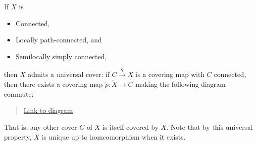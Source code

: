 \begin{proposition}

If \(X\) is

\begin{itemize}
\tightlist
\item
  Connected,
\item
  Locally path-connected, and
\item
  Semilocally simply connected,
\end{itemize}

then \(X\) admits a universal cover: if \(C \xrightarrow{q} X\) is a
covering map with \(C\) connected, then there exists a covering map
\(\tilde p: \tilde X \to C\) making the following diagram commute:

\begin{center}
\end{center}

\begin{quote}
\href{https://q.uiver.app/?q=WzAsMyxbMCwyLCJYIl0sWzAsMCwiQyJdLFsyLDAsIlxcdGlsZGUgWCJdLFsxLDAsInEiLDAseyJzdHlsZSI6eyJoZWFkIjp7Im5hbWUiOiJlcGkifX19XSxbMiwwLCJwIiwwLHsic3R5bGUiOnsiaGVhZCI6eyJuYW1lIjoiZXBpIn19fV0sWzIsMSwiXFx0aWxkZSBwIiwyLHsic3R5bGUiOnsiYm9keSI6eyJuYW1lIjoiZGFzaGVkIn0sImhlYWQiOnsibmFtZSI6ImVwaSJ9fX1dXQ==}{Link
to diagram}
\end{quote}

That is, any other cover \(C\) of \(X\) is itself covered by
\(\tilde X\). Note that by this universal property, \(\tilde X\) is
unique up to homeomorphism when it exists.

\end{proposition}

